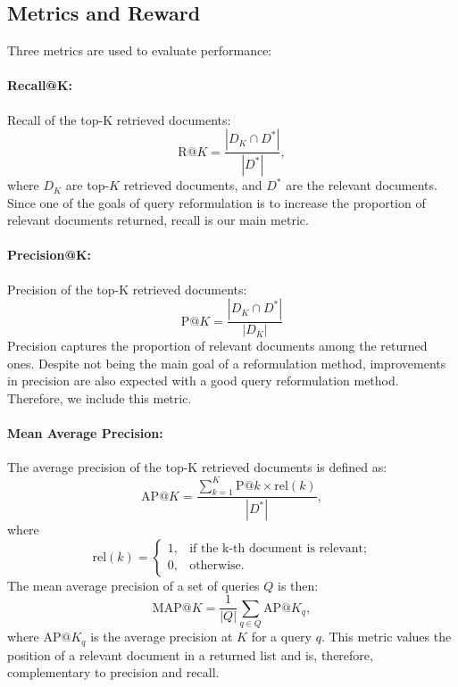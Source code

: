 \documentclass[11pt,letterpaper]{article}
\begin{document}
\subsection{Metrics and Reward}

Three metrics are used to evaluate performance:

\paragraph{Recall@K:} Recall of the top-K retrieved documents: 
\begin{equation}
	\text{R}@K = \frac{|D_K \cap D^*|}{|D^*|},
\end{equation}
where $D_K$ are top-$K$ retrieved documents, and $D^*$ are the relevant documents. Since one of the goals of query reformulation is to increase the proportion of relevant documents returned, recall is our main metric.

\paragraph{Precision@K:} Precision of the top-K retrieved documents:
\begin{equation}
	\text{P}@K = \frac{|D_K \cap D^*|}{|D_K|}
\end{equation}
Precision captures the proportion of relevant documents among the returned ones. Despite not being the main goal of a reformulation method, improvements in precision are also expected with a good query reformulation method. Therefore, we include this metric.

\paragraph{Mean Average Precision:} The average precision of the top-K retrieved documents is defined as:
\begin{equation}
	\text{AP}@K = \frac{\sum_{k=1}^K \text{P}@k \times \text{rel}(k)}{|D^*|},
\end{equation}
where
\begin{equation}
	\text{rel}(k) = 
    \begin{cases}
        1, & \text{if the k-th document is relevant;}\\
        0, & \text{otherwise.}
    \end{cases}
\end{equation}
The mean average precision of a set of queries $Q$ is then:
\begin{equation}
	\text{MAP}@K = \frac{1}{|Q|}\sum_{q \in Q} \text{AP}@K_q,
\end{equation}
where $\text{AP}@K_q$ is the average precision at $K$ for a query $q$. This metric values the position of a relevant document in a returned list and is, therefore, complementary to precision and recall. 
\end{document}
